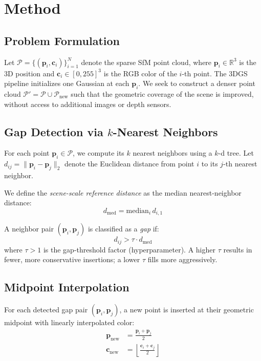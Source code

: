 \documentclass[12pt, a4paper]{article}
\begin{document}
\section{Method}

\subsection{Problem Formulation}

Let $\mathcal{P} = \{(\mathbf{p}_i, \mathbf{c}_i)\}_{i=1}^{N}$ denote the sparse
SfM point cloud, where $\mathbf{p}_i \in \mathbb{R}^3$ is the 3D position and
$\mathbf{c}_i \in [0,255]^3$ is the RGB color of the $i$-th point. The 3DGS
pipeline initializes one Gaussian at each $\mathbf{p}_i$. We seek to construct a
denser point cloud
$\mathcal{P}' = \mathcal{P} \cup \mathcal{P}_\text{new}$
such that the geometric coverage of the scene is improved, without access to
additional images or depth sensors.

\subsection{Gap Detection via $k$-Nearest Neighbors}

For each point $\mathbf{p}_i \in \mathcal{P}$, we compute its $k$ nearest
neighbors using a $k$-d tree. Let $d_{ij} = \|\mathbf{p}_i - \mathbf{p}_j\|_2$
denote the Euclidean distance from point $i$ to its $j$-th nearest neighbor.

We define the \textit{scene-scale reference distance} as the median nearest-neighbor
distance:
\begin{equation}
    d_\text{med} = \mathrm{median}_{i}\, d_{i,1}
    \label{eq:dmed}
\end{equation}

A neighbor pair $(\mathbf{p}_i, \mathbf{p}_j)$ is classified as a \textit{gap} if:
\begin{equation}
    d_{ij} > \tau \cdot d_\text{med}
    \label{eq:gap}
\end{equation}
where $\tau > 1$ is the gap-threshold factor (hyperparameter). A higher $\tau$
results in fewer, more conservative insertions; a lower $\tau$ fills more aggressively.

\subsection{Midpoint Interpolation}

For each detected gap pair $(\mathbf{p}_i, \mathbf{p}_j)$, a new point is inserted
at their geometric midpoint with linearly interpolated color:
\begin{align}
    \mathbf{p}_\text{new} &= \frac{\mathbf{p}_i + \mathbf{p}_j}{2}
    \label{eq:midpoint} \\
    \mathbf{c}_\text{new} &= \left\lfloor\frac{\mathbf{c}_i + \mathbf{c}_j}{2}\right\rfloor
    \label{eq:colorinterp}
\end{align}
\end{document}
